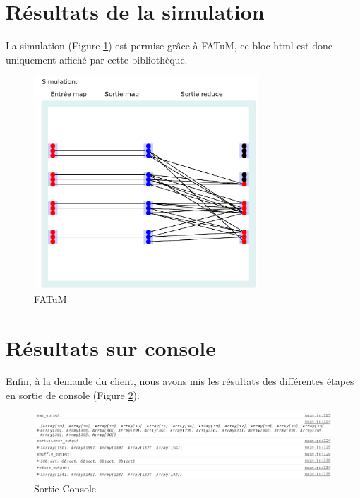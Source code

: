 \section{Résultats de la simulation}
La simulation (Figure \ref{fig:Fatum}) est permise grâce à FATuM, ce bloc html est donc uniquement affiché par cette bibliothèque.
\begin{figure}[H]
  \centering
    \includegraphics[width=0.75\textwidth]{images/simulation_pdp.png}
        \caption{FATuM}
        \label{fig:Fatum}
\end{figure}
\section{Résultats sur console}
Enfin, à la demande du client, nous avons mis les résultats des différentes étapes en sortie de console (Figure \ref{fig:SortieConsole}).
\begin{figure}[H]
  \centering
    \includegraphics[width=1\textwidth]{images/resultat_console.png}
        \caption{Sortie Console}
        \label{fig:SortieConsole}
\end{figure}
